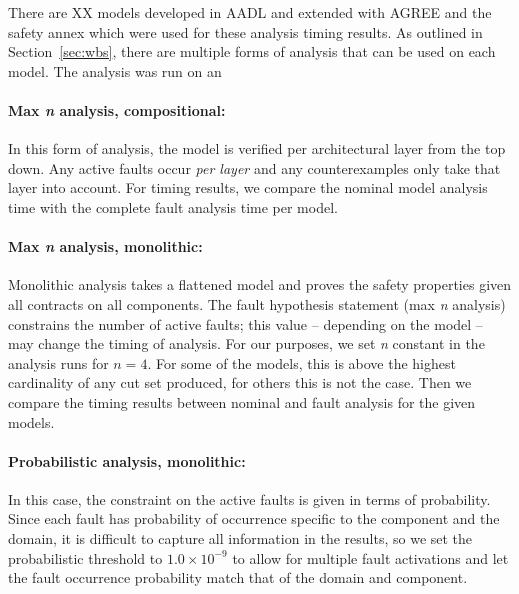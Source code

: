 There are XX models developed in AADL and extended with AGREE and the safety annex which were used for these analysis timing results. As outlined in Section~\ref{sec:wbs}, there are multiple forms of analysis that can be used on each model. The analysis was run on an 

\paragraph{Max \textit{n} analysis, compositional:} In this form of analysis, the model is verified per architectural layer from the top down. Any active faults occur {\em per layer} and any counterexamples only take that layer into account. For timing results, we compare the nominal model analysis time with the complete fault analysis time per model. 


\paragraph{Max \textit{n} analysis, monolithic:} Monolithic analysis takes a flattened model and proves the safety properties given all contracts on all components. The fault hypothesis statement (max \textit{n} analysis) constrains the number of active faults; this value -- depending on the model -- may change the timing of analysis. For our purposes, we set \textit{n} constant in the analysis runs for $n = 4$. For some of the models, this is above the highest cardinality of any cut set produced, for others this is not the case. Then we compare the timing results between nominal and fault analysis for the given models.


\paragraph{Probabilistic analysis, monolithic:} In this case, the constraint on the active faults is given in terms of probability. Since each fault has probability of occurrence specific to the component and the domain, it is difficult to capture all information in the results, so we set the probabilistic threshold to $1.0 \times 10^{-9}$ to allow for multiple fault activations and let the fault occurrence probability match that of the domain and component. 

